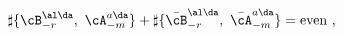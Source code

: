 \begin{equation}
\sharp \{\cB_{-r}^{\al\da},~ \cA_{-m}^{a\da}\} + 
   \sharp \{\bar{\cB}_{-r}^{\al\da},~ \bar{\cA}_{-m}^{a\da}\} = \mbox{even}~,
\end{equation}

